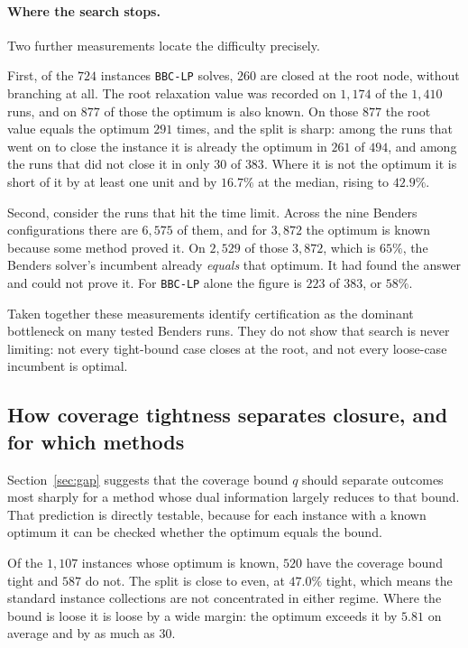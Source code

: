 \paragraph{Where the search stops.}
Two further measurements locate the difficulty precisely.

First, of the $724$ instances \texttt{BBC-LP} solves, $260$ are closed at the root
node, without branching at all. The root relaxation value was recorded on $1{,}174$ of
the $1{,}410$ runs, and on $877$ of those the optimum is also known. On those $877$ the
root value equals the optimum $291$ times, and the split is sharp: among the runs that
went on to close the instance it is already the optimum in $261$ of $494$, and among
the runs that did not close it in only $30$ of $383$. Where it is not the optimum it is
short of it by at least one unit and by $16.7\%$ at the median, rising to $42.9\%$.

Second, consider the runs that hit the time limit. Across the nine Benders
configurations there are $6{,}575$ of them, and for $3{,}872$ the optimum is known
because some method proved it. On $2{,}529$ of those $3{,}872$, which is $65\%$, the
Benders solver's incumbent already \emph{equals} that optimum. It had found the answer
and could not prove it. For \texttt{BBC-LP} alone the figure is $223$ of $383$, or
$58\%$.

Taken together these measurements identify certification as the dominant bottleneck on
many tested Benders runs. They do not show that search is never limiting: not every
tight-bound case closes at the root, and not every loose-case incumbent is optimal.

\subsection{How coverage tightness separates closure, and for which methods}\label{ssec:results-tight}

Section~\ref{sec:gap} suggests that the coverage bound $q$ should separate outcomes
most sharply for a method whose dual information largely reduces to that bound. That
prediction is directly testable, because for each instance with a known optimum it can
be checked whether the optimum equals the bound.

Of the $1{,}107$ instances whose optimum is known, $520$ have the coverage bound tight
and $587$ do not. The split is close to even, at $47.0\%$ tight, which means the
standard instance collections are not concentrated in either regime. Where the bound is
loose it is loose by a wide margin: the optimum exceeds it by $5.81$ on average and by
as much as $30$.

